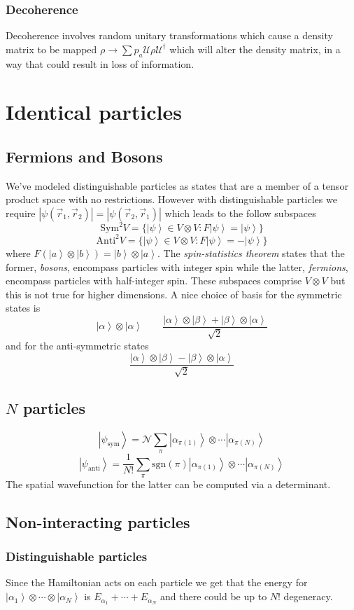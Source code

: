 \documentclass{article}
\newcommand{\ket}[1]{\left|#1\right\rangle}
\begin{document}
\subsubsection{Decoherence}
Decoherence involves random unitary transformations which cause a density matrix to be mapped $\rho \rightarrow \sum p_a \mathcal{U}\rho \mathcal{U}^{\dagger}$ which will alter the density matrix, in a way that could result in loss of information. 
\section{Identical particles}
\subsection{Fermions and Bosons}
We've modeled distinguishable particles as states that are a member of a tensor product space with no restrictions. However with distinguishable particles we require $|\psi(\vec r_1, \vec r_2)| = |\psi(\vec r_2, \vec r_1)|$ which leads to the follow subspaces
$$\text{Sym}^2 V = \{\ket{\psi}\in V \otimes V : F\ket{\psi} =\ket{\psi}\}$$
$$\text{Anti}^2 V = \{\ket{\psi}\in V \otimes V : F\ket{\psi} =-\ket{\psi}\}$$
where $F(\ket{a}\otimes\ket{b})=\ket{b}\otimes\ket{a}$.
The \emph{spin-statistics theorem} states that the former, \emph{bosons}, encompass particles with integer spin while the latter, \emph{fermions}, encompass particles with half-integer spin. These subspaces comprise $V\otimes V $ but this is not true for higher dimensions. A nice choice of basis for the symmetric states is $$\ket{\alpha}\otimes\ket{\alpha} \qquad \frac{\ket{\alpha}\otimes\ket{\beta}+\ket{\beta}\otimes\ket{\alpha}}{\sqrt{2}}$$
and for the anti-symmetric states
$$\frac{\ket{\alpha}\otimes\ket{\beta}-\ket{\beta}\otimes\ket{\alpha}}{\sqrt{2}}$$
\subsection{$N$ particles}
$$\ket{\psi_{\text{sym}}} = \mathcal{N} \sum_{\pi} \ket{\alpha_{\pi(1)}}\otimes \cdots \ket{\alpha_{\pi(N)}}$$
$$\ket{\psi_{\text{anti}}} = \frac{1}{N!}\sum_{\pi} \text{sgn}(\pi) \ket{\alpha_{\pi(1)}}\otimes \cdots \ket{\alpha_{\pi(N)}}$$
The spatial wavefunction for the latter can be computed via a determinant.
\subsection{Non-interacting particles}
\subsubsection{Distinguishable particles}
Since the Hamiltonian acts on each particle we get that the energy for $\ket{\alpha_1}\otimes \cdots \otimes \ket{\alpha_N}$ is $E_{\alpha_1} + \cdots + E_{\alpha_N}$ and there could be up to $N!$ degeneracy.
\end{document}
